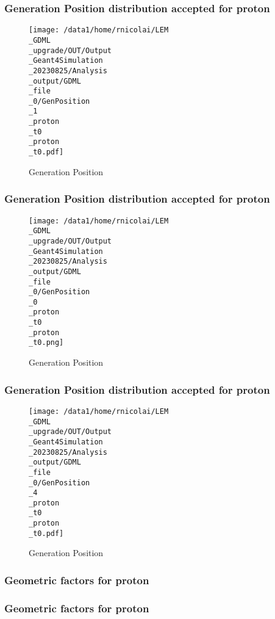 \documentclass[8pt]{beamer}
\begin{document}
            \begin{frame}
                \frametitle{Generation Position distribution accepted for proton}
            
        \begin{figure}[h]
            \centering
            \texttt{[image: /data1/home/rnicolai/LEM\\\_GDML\\\_upgrade/OUT/Output\\\_Geant4Simulation\\\_20230825/Analysis\\\_output/GDML\\\_file\\\_0/GenPosition\\\_1\\\_proton\\\_t0\\\_proton\\\_t0.pdf]}
            \caption{Generation Position}
        \end{figure}
        
            \end{frame}
            
            \begin{frame}
                \frametitle{Generation Position distribution accepted for proton}
            
        \begin{figure}[h]
            \centering
            \texttt{[image: /data1/home/rnicolai/LEM\\\_GDML\\\_upgrade/OUT/Output\\\_Geant4Simulation\\\_20230825/Analysis\\\_output/GDML\\\_file\\\_0/GenPosition\\\_0\\\_proton\\\_t0\\\_proton\\\_t0.png]}
            \caption{Generation Position}
        \end{figure}
        
            \end{frame}
            
            \begin{frame}
                \frametitle{Generation Position distribution accepted for proton}
            
        \begin{figure}[h]
            \centering
            \texttt{[image: /data1/home/rnicolai/LEM\\\_GDML\\\_upgrade/OUT/Output\\\_Geant4Simulation\\\_20230825/Analysis\\\_output/GDML\\\_file\\\_0/GenPosition\\\_4\\\_proton\\\_t0\\\_proton\\\_t0.pdf]}
            \caption{Generation Position}
        \end{figure}
        
            \end{frame}
            
            \begin{frame}
                \frametitle{Geometric factors for proton}
            
            \end{frame}
            
            \begin{frame}
                \frametitle{Geometric factors for proton}
            
            \end{frame}
            
\end{document}
